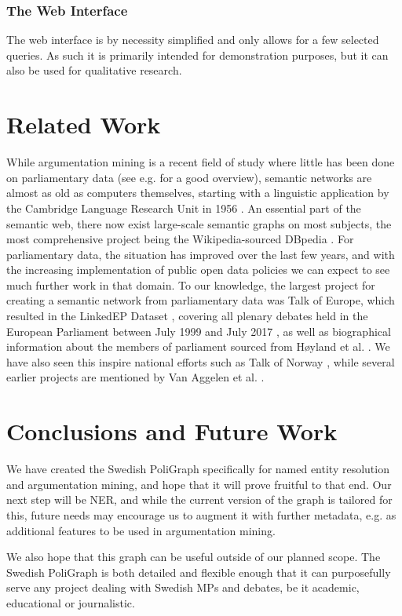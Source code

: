 \subsubsection{The Web Interface}

The web interface is by necessity simplified and only allows for a few selected queries. As such it is primarily intended for demonstration purposes, but it can also be used for qualitative research.



\section{Related Work}

While argumentation mining is a recent field of study where little has been done on parliamentary data (see e.g. \cite{lippi_argumentation_2016} for a good overview), semantic networks are almost as old as computers themselves, starting with a linguistic application by the Cambridge Language Research Unit in 1956 \cite{lehmann_semantic_1992}. An essential part of the semantic web, there now exist large-scale semantic graphs on most subjects, the most comprehensive project being the Wikipedia-sourced DBpedia \cite{lehmann_dbpedia_2015}. For parliamentary data, the situation has improved over the last few years, and with the increasing implementation of public open data policies we can expect to see much further work in that domain. To our knowledge, the largest project for creating a semantic network from parliamentary data was Talk of Europe, which resulted in the LinkedEP Dataset \cite{hollink_talk_2017}, covering all plenary debates held in the European Parliament between July 1999 and July 2017 \cite{van_aggelen_debates_2017}, as well as biographical information about the members of parliament sourced from Høyland et al. \cite{hoyland_forum_2009}. We have also seen this inspire national efforts such as Talk of Norway \cite{lapponi_talk_2018}, while several earlier projects are mentioned by Van Aggelen et al. \cite{van_aggelen_debates_2017}.

\section{Conclusions and Future Work}

We have created the Swedish PoliGraph specifically for named entity resolution and argumentation mining, and hope that it will prove fruitful to that end. Our next step will be NER, and while the current version of the graph is tailored for this, future needs may encourage us to augment it with further metadata, e.g. as additional features to be used in argumentation mining.

We also hope that this graph can be useful outside of our planned scope. The Swedish PoliGraph is both detailed and flexible enough that it can purposefully serve any project dealing with Swedish MPs and debates, be it academic, educational or journalistic.